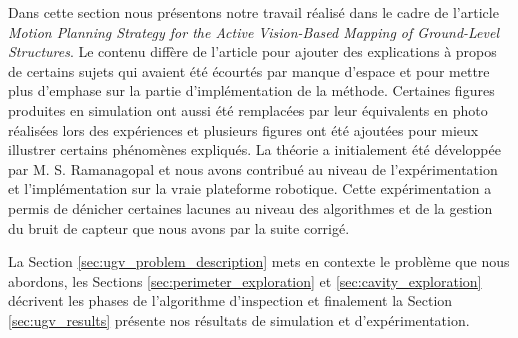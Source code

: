 \label{sec:ugv}

Dans cette section nous présentons notre travail réalisé dans le cadre de l'article \textit{Motion Planning Strategy for the Active Vision-Based Mapping of Ground-Level Structures}. Le contenu diffère de l'article pour ajouter des explications à propos de certains sujets qui avaient été écourtés par manque d'espace et pour mettre plus d'emphase sur la partie d'implémentation de la méthode. Certaines figures produites en simulation ont aussi été remplacées par leur équivalents en photo réalisées lors des expériences et plusieurs figures ont été ajoutées pour mieux illustrer certains phénomènes expliqués. La théorie a initialement été développée par M. S. Ramanagopal et nous avons contribué au niveau de l'expérimentation et l'implémentation sur la vraie plateforme robotique. Cette expérimentation a permis de dénicher certaines lacunes au niveau des algorithmes et de la gestion du bruit de capteur que nous avons par la suite corrigé.

La Section \ref{sec:ugv_problem_description} mets en contexte le problème que nous abordons, les Sections \ref{sec:perimeter_exploration} et \ref{sec:cavity_exploration} décrivent les phases de l'algorithme d'inspection et finalement la Section \ref{sec:ugv_results} présente nos résultats de simulation et d'expérimentation.

